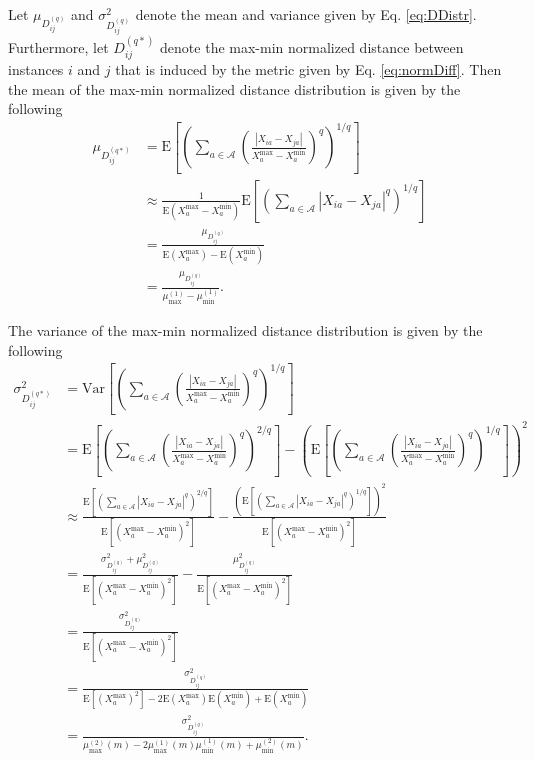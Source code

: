 \documentclass[10pt,letterpaper]{article}\usepackage[]{graphicx}\usepackage[]{color}
\begin{document}
Let $\mu_{D^{(q)}_{ij}}$ and $\sigma^2_{D^{(q)}_{ij}}$ denote the mean and variance given by Eq. \ref{eq:DDistr}. Furthermore, let $D^{(q*)}_{ij}$ denote the max-min normalized distance between instances $i$ and $j$ that is induced by the metric given by Eq. \ref{eq:normDiff}. Then the mean of the max-min normalized distance distribution is given by the following
%
\begin{equation}\label{eq:max-min_D_mean}
\begin{aligned}
\mu_{D^{(q*)}_{ij}} &= \text{E}\left[\left(\sum_{a \in \mathcal{A}}\left(\frac{|X_{ia} - X_{ja}|}{X^\text{max}_a - X^\text{min}_a}\right)^q\right)^{1/q}\right] \\
&\approx \frac{1}{\text{E}(X^\text{max}_a - X^\text{min}_a)}\text{E}\left[\left(\sum_{a \in \mathcal{A}}|X_{ia} - X_{ja}|^q\right)^{1/q}\right] \\
&= \frac{\mu_{D^{(q)}_{ij}}}{\text{E}(X^\text{max}_a) - \text{E}(X^\text{min}_a)} \\
&= \frac{\mu_{D^{(q)}_{ij}}}{\mu^{(1)}_\text{max} - \mu^{(1)}_\text{min}}.
\end{aligned}
\end{equation}

The variance of the max-min normalized distance distribution is given by the following
%
\begin{equation}\label{eq:max-min_D_var}
\begin{aligned}
\sigma^2_{D^{(q*)}_{ij}} &= \text{Var}\left[\left(\sum_{a \in \mathcal{A}}\left(\frac{|X_{ia} - X_{ja}|}{X^\text{max}_a - X^\text{min}_a}\right)^q\right)^{1/q}\right] \\
&= \text{E}\left[\left(\sum_{a \in \mathcal{A}}\left(\frac{|X_{ia} - X_{ja}|}{X^\text{max}_a - X^\text{min}_a}\right)^q\right)^{2/q}\right] - \left(\text{E}\left[\left(\sum_{a \in \mathcal{A}}\left(\frac{|X_{ia} - X_{ja}|}{X^\text{max}_a - X^\text{min}_a}\right)^q\right)^{1/q}\right]\right)^2 \\
&\approx \frac{\text{E}\left[\left(\displaystyle \sum_{a \in \mathcal{A}}|X_{ia} - X_{ja}|^q\right)^{2/q}\right]}{\text{E}[(X^\text{max}_a - X^\text{min}_a)^2]} - \frac{\left(\text{E}\left[\left(\displaystyle \sum_{a \in \mathcal{A}}|X_{ia} - X_{ja}|^q\right)^{1/q}\right]\right)^2}{\text{E}[(X^\text{max}_a - X^\text{min}_a)^2]} \\
&= \frac{\sigma^2_{D^{(q)}_{ij}} + \mu^2_{D^{(q)}_{ij}}}{\text{E}[(X^\text{max}_a - X^\text{min}_a)^2]} - \frac{\mu^2_{D^{(q)}_{ij}}}{\text{E}[(X^\text{max}_a - X^\text{min}_a)^2]} \\
&= \frac{\sigma^2_{D^{(q)}_{ij}}}{\text{E}[(X^\text{max}_a - X^\text{min}_a)^2]} \\
&= \frac{\sigma^2_{D^{(q)}_{ij}}}{\text{E}[(X^\text{max}_a)^2] - 2\text{E}(X^\text{max}_a)\text{E}(X^\text{min}_a) + \text{E}(X^\text{min}_a)} \\
&= \frac{\sigma^2_{D^{(q)}_{ij}}}{\mu^{(2)}_\text{max}(m) - 2\mu^{(1)}_\text{max}(m)\mu^{(1)}_\text{min}(m) + \mu^{(2)}_\text{min}(m)}.
\end{aligned}
\end{equation}
\end{document}
